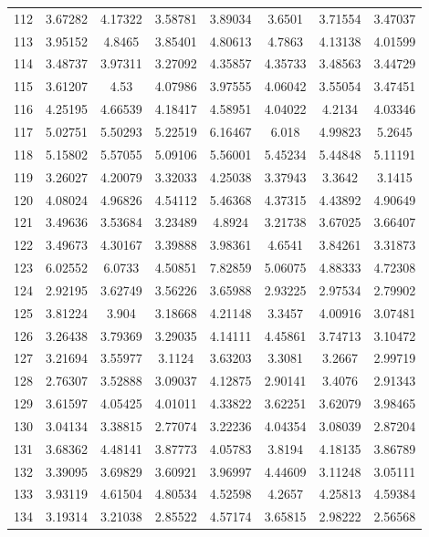 \begin{figure}
\begin{tabular}{cccccccc}
112 & 3.67282 & 4.17322 & 3.58781 & 3.89034 & 3.6501 & 3.71554 & 3.47037\\
113 & 3.95152 & 4.8465 & 3.85401 & 4.80613 & 4.7863 & 4.13138 & 4.01599\\
114 & 3.48737 & 3.97311 & 3.27092 & 4.35857 & 4.35733 & 3.48563 & 3.44729\\
115 & 3.61207 & 4.53 & 4.07986 & 3.97555 & 4.06042 & 3.55054 & 3.47451\\
116 & 4.25195 & 4.66539 & 4.18417 & 4.58951 & 4.04022 & 4.2134 & 4.03346\\
117 & 5.02751 & 5.50293 & 5.22519 & 6.16467 & 6.018 & 4.99823 & 5.2645\\
118 & 5.15802 & 5.57055 & 5.09106 & 5.56001 & 5.45234 & 5.44848 & 5.11191\\
119 & 3.26027 & 4.20079 & 3.32033 & 4.25038 & 3.37943 & 3.3642 & 3.1415\\
120 & 4.08024 & 4.96826 & 4.54112 & 5.46368 & 4.37315 & 4.43892 & 4.90649\\
121 & 3.49636 & 3.53684 & 3.23489 & 4.8924 & 3.21738 & 3.67025 & 3.66407\\
122 & 3.49673 & 4.30167 & 3.39888 & 3.98361 & 4.6541 & 3.84261 & 3.31873\\
123 & 6.02552 & 6.0733 & 4.50851 & 7.82859 & 5.06075 & 4.88333 & 4.72308\\
124 & 2.92195 & 3.62749 & 3.56226 & 3.65988 & 2.93225 & 2.97534 & 2.79902\\
125 & 3.81224 & 3.904 & 3.18668 & 4.21148 & 3.3457 & 4.00916 & 3.07481\\
126 & 3.26438 & 3.79369 & 3.29035 & 4.14111 & 4.45861 & 3.74713 & 3.10472\\
127 & 3.21694 & 3.55977 & 3.1124 & 3.63203 & 3.3081 & 3.2667 & 2.99719\\
128 & 2.76307 & 3.52888 & 3.09037 & 4.12875 & 2.90141 & 3.4076 & 2.91343\\
129 & 3.61597 & 4.05425 & 4.01011 & 4.33822 & 3.62251 & 3.62079 & 3.98465\\
130 & 3.04134 & 3.38815 & 2.77074 & 3.22236 & 4.04354 & 3.08039 & 2.87204\\
131 & 3.68362 & 4.48141 & 3.87773 & 4.05783 & 3.8194 & 4.18135 & 3.86789\\
132 & 3.39095 & 3.69829 & 3.60921 & 3.96997 & 4.44609 & 3.11248 & 3.05111\\
133 & 3.93119 & 4.61504 & 4.80534 & 4.52598 & 4.2657 & 4.25813 & 4.59384\\
134 & 3.19314 & 3.21038 & 2.85522 & 4.57174 & 3.65815 & 2.98222 & 2.56568\\

\end{tabular}
\end{figure}
